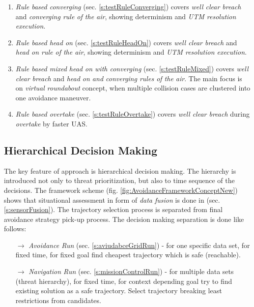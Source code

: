 \begin{enumerate}
    \item \emph{Rule based converging} (sec. \ref{s:testRuleConverging}) covers \emph{well clear breach} and \emph{converging rule of the air}, showing determinism and \emph{UTM resolution execution}.
    
    \item \emph{Rule based head on} (sec. \ref{s:testRuleHeadOn}) covers \emph{well clear breach} and \emph{head on rule of the air}, showing determinism and \emph{UTM resolution execution}.
    
    \item \emph{Rule based mixed head on with converging} (sec. \ref{s:testRuleMixed}) covers \emph{well clear breach} and \emph{head on and converging rules of the air}. The main focus is on \emph{virtual roundabout} concept, when multiple collision cases are clustered into one avoidance maneuver. 
    
    \item \emph{Rule based overtake} (sec. \ref{s:testRuleOvertake}) covers \emph{well clear breach} during \emph{overtake} by faster UAS.
\end{enumerate}


\subsection{ Hierarchical Decision Making}\label{s:conclusionAvoidanceNavigationRun}
\noindent The key feature of approach is hierarchical decision making. The hierarchy is introduced not only to threat prioritization, but also to time sequence of the decisions. The framework scheme (fig. \ref{fig:AvoidanceFrameworkConceptNew}) shows that situational assessment in form of \emph{data fusion} is done in (sec. \ref{s:sensorFusion}). The trajectory selection process is separated from final avoidance strategy pick-up process. The decision making separation is done like follows:

\begin{itemize}
    \item[$\to$] \emph{Avoidance Run} (sec. \ref{s:aviudabceGridRun}) - for one specific data set, for fixed time, for fixed goal find cheapest trajectory which is safe (reachable).
    
    \item[$\to$] \emph{Navigation Run} (sec. \ref{s:missionControlRun}) - for multiple data sets (threat hierarchy), for fixed time, for context depending goal try to find existing solution as a safe trajectory. Select trajectory breaking least restrictions from candidates.
\end{itemize}

